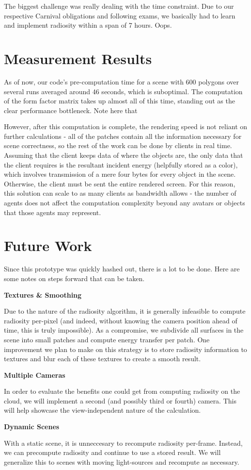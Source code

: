 \documentclass{article}
\begin{document}
\begin{multicols}{2}
The biggest challenge was really dealing with the time constraint. Due to our respective Carnival obligations and following exams, we basically had to learn and implement radiosity within a span of 7 hours. Oops.

\section{Measurement Results}
As of now, our code's pre-computation time for a scene with 600 polygons over several runs averaged around 46 seconds, which is suboptimal. The computation of the form factor matrix takes up almost all of this time, standing out as the clear performance bottleneck. Note here that 

However, after this computation is complete, the rendering speed is not reliant on further calculations - all of the patches contain all the information necessary for scene correctness, so the rest of the work can be done by clients in real time. Assuming that the client keeps data of where the objects are, the only data that the client requires is the resultant incident energy (helpfully stored as a color), which involves transmission of a mere four bytes for every object in the scene. Otherwise, the client must be sent the entire rendered screen. For this reason, this solution can scale to as many clients as bandwidth allows - the number of agents does not affect the computation complexity beyond any avatars or objects that those agents may represent.

\section{Future Work}
Since this prototype was quickly hashed out, there is a lot to be done. Here are some notes on steps forward that can be taken.


{\bf Textures \& Smoothing}

Due to the nature of the radiosity algorithm, it is generally infeasible to compute radiosity per-pixel (and indeed, without knowing the camera position ahead of time, this is truly impossible). As a compromise, we subdivide all surfaces in the scene into small patches and compute energy transfer per patch. One improvement we plan to make on this strategy is to store radiosity information to textures and blur each of these textures to create a smooth result.

{\bf Multiple Cameras}

In order to evaluate the benefits one could get from computing radiosity on the cloud, we will implement a second (and possibly third or fourth) camera.  This will help showcase the view-independent nature of the calculation.

{\bf Dynamic Scenes}

With a static scene, it is unneccesary to recompute radiosity per-frame. Instead, we can precompute radiosity and continue to use a stored result. We will generalize this to scenes with moving light-sources and recompute as necessary.

\end{multicols}
\end{document}
